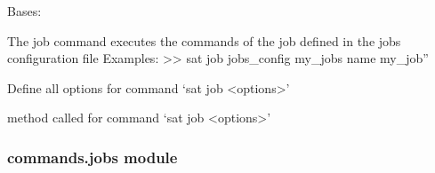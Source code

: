 \documentclass[a4paper,10pt,english]{sphinxmanual}
\begin{document}
\begin{fulllineitems}
\label{\detokenize{apidoc_commands/commands:commands.job.Command}}
Bases: 

The job command executes the commands of the job defined
in the jobs configuration file  
\textbar{} Examples:
\textbar{} \textgreater{}\textgreater{} sat job \textendash{}jobs\_config my\_jobs \textendash{}name my\_job”

\begin{fulllineitems}
\label{\detokenize{apidoc_commands/commands:commands.job.Command.getParser}}
Define all options for command ‘sat job \textless{}options\textgreater{}’

\end{fulllineitems}


\begin{fulllineitems}
\label{\detokenize{apidoc_commands/commands:commands.job.Command.name}}
\end{fulllineitems}


\begin{fulllineitems}
\label{\detokenize{apidoc_commands/commands:commands.job.Command.run}}
method called for command ‘sat job \textless{}options\textgreater{}’

\end{fulllineitems}


\end{fulllineitems}



\subsubsection{commands.jobs module}
\label{\detokenize{apidoc_commands/commands:commands-jobs-module}}\label{\detokenize{apidoc_commands/commands:module-commands.jobs}}
\end{document}
